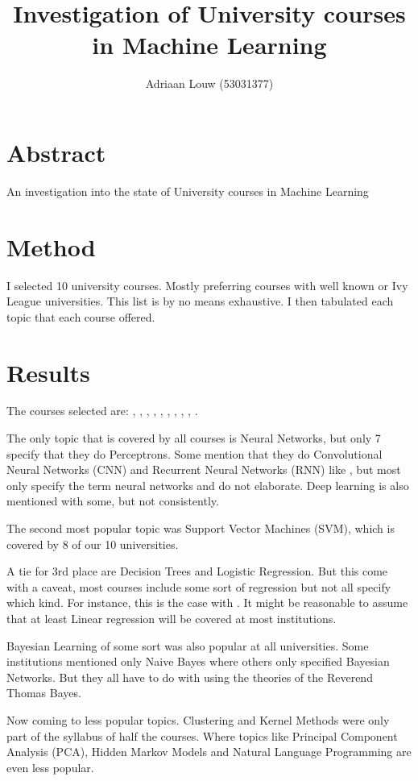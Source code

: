 \documentclass[10pt,a4paper]{article}
\title{Investigation of University courses in Machine Learning}
\author{ Adriaan Louw (53031377)}
\begin{document}
\maketitle

\tableofcontents

\section{Abstract}
An investigation into the state of University courses in Machine Learning

\section{Method}
I selected 10 university courses. Mostly preferring courses with well known or Ivy League universities. This list is by no means exhaustive. I then tabulated each topic that each course offered.

\section{Results}
The courses selected are: \cite{stan1}, \cite{buf}, \cite{mit}, \cite{prince}, \cite{ucla},
\cite{mic}, \cite{nor}, \cite{col1}, \cite{mel}, \cite{was}.

The only topic that is covered by all courses is Neural Networks, but only 7 specify that they do Perceptrons. Some mention that they do Convolutional Neural Networks (CNN) and Recurrent Neural Networks (RNN) like \cite{nor}, but most only specify the term neural networks and do not elaborate. Deep learning is also mentioned with some, but not consistently.

The second most popular topic was Support Vector Machines (SVM), which is covered by 8 of our 10 universities.

A tie for 3rd place are Decision Trees and Logistic Regression. But this come with a caveat, most courses include some sort of regression but not all specify which kind. For instance, this is the case with \cite{mel}. It might be reasonable to assume that at least Linear regression will be covered at most institutions.

Bayesian Learning of some sort was also popular at all universities. Some institutions mentioned only Naive Bayes where others only specified Bayesian Networks. But they all have to do with using the theories of the Reverend Thomas Bayes.

Now coming to less popular topics. Clustering and Kernel Methods were only part of the syllabus of half the courses. Where topics like Principal Component Analysis (PCA), Hidden Markov Models and Natural Language Programming are even less popular.
\end{document}
